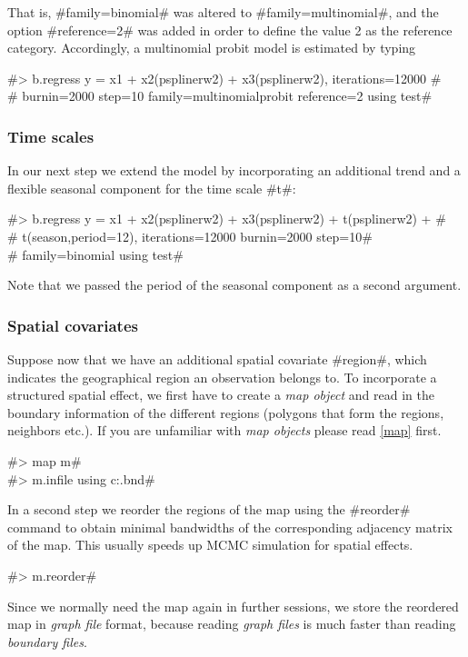 That is, #family=binomial# was altered to #family=multinomial#,
and the option #reference=2# was added in order to define the
value 2 as the reference category. Accordingly, a multinomial
probit model is estimated by typing

 #> b.regress y = x1 + x2(psplinerw2) + x3(psplinerw2), iterations=12000 #\\
 #  burnin=2000 step=10 family=multinomialprobit reference=2 using test#

\subsubsection*{Time scales}

In our next step we extend the model by incorporating an
additional trend and a flexible seasonal component for the time
scale #t#:

#> b.regress y = x1 + x2(psplinerw2) + x3(psplinerw2) + t(psplinerw2) + #\\
#  t(season,period=12), iterations=12000 burnin=2000 step=10#\\
#  family=binomial using test#

Note that we passed the period of the seasonal component as a
second argument.

\subsubsection*{Spatial covariates}

Suppose now that we have an additional spatial covariate #region#,
which indicates the geographical region an observation belongs to.
To incorporate a structured spatial effect, we first have to
create a {\em map object} and read in the boundary information of
the different regions (polygons that form the regions, neighbors
etc.). If you are unfamiliar with {\em map objects} please read
\autoref{map} first.

#> map m# \\
#> m.infile using c:\maps\map.bnd#

In a second step we reorder the regions of the map using the
#reorder# command to obtain minimal bandwidths of the
corresponding adjacency matrix of the map. This usually speeds up
MCMC simulation for spatial effects.

#> m.reorder#

Since we normally need the map again in further sessions, we store
the reordered map in {\em graph file} format, because reading {\em
graph files} is much faster than reading {\em boundary files}.

